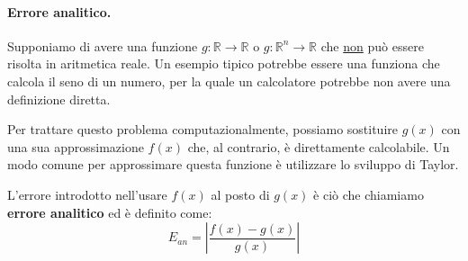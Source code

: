 \documentclass{article}
\numberwithin{equation}{section}
\begin{document}
\paragraph{Errore analitico.} Supponiamo di avere una funzione
$g:\mathbb{R}\rightarrow \mathbb{R}$ o $g:\mathbb{R}^n\rightarrow \mathbb{R}$
che \underline{non} può essere risolta in aritmetica reale. Un esempio tipico potrebbe essere
una funziona che calcola il seno di un numero, per la quale un calcolatore
potrebbe non avere una definizione diretta.

Per trattare questo problema computazionalmente, possiamo sostituire 
$g(x)$ con una sua approssimazione $f(x)$ che, al contrario, è direttamente
calcolabile. Un modo comune per approssimare questa funzione è utilizzare lo
sviluppo di Taylor.

L'errore introdotto nell'usare $f(x)$ al posto di $g(x)$ è ciò che chiamiamo
\textbf{errore analitico} ed è definito come:
$$E_{an}=\left\lvert \frac{f(x)-g(x)}{g(x)}\right\rvert$$
\end{document}
